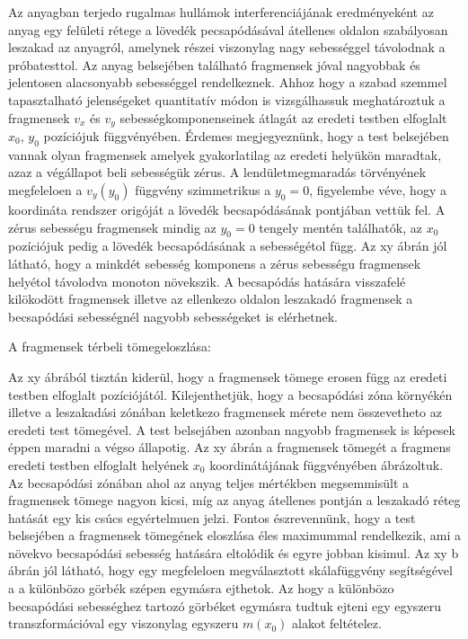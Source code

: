 Az anyagban terjedo rugalmas hullámok interferenciájának eredményeként az anyag egy felületi rétege a lövedék pecsapódásával átellenes oldalon
szabályosan leszakad az anyagról, amelynek részei viszonylag nagy sebességgel távolodnak a próbatesttol. Az anyag belsejében található fragmensek
jóval nagyobbak és jelentosen alacsonyabb sebességgel rendelkeznek. Ahhoz hogy a szabad szemmel tapasztalható jelenségeket quantitatív módon is 
vizsgálhassuk meghatároztuk a fragmensek $v_x$ és $v_y$ sebességkomponenseinek átlagát az eredeti testben elfoglalt $x_0$, $y_0$ pozíciójuk függvényében.
Érdemes megjegyeznünk, hogy a test belsejében vannak olyan fragmensek amelyek gyakorlatilag az eredeti helyükön maradtak, azaz a végállapot beli
sebességük zérus. A lendületmegmaradás törvényének megfeleloen a $v_y(y_0)$ függvény szimmetrikus a $y_0=0$, figyelembe véve, hogy a koordináta rendszer 
origóját a lövedék becsapódásának pontjában vettük fel. A zérus sebességu fragmensek mindig az $y_0=0$ tengely mentén találhatók, az
$x_0$ pozíciójuk pedig a lövedék becsapódásának a sebességétol függ. Az xy ábrán jól látható, hogy a minkdét sebesség komponens a zérus sebességu
fragmensek helyétol távolodva monoton növekszik. A becsapódás hatására visszafelé kilökodött fragmensek illetve az ellenkezo oldalon leszakadó
fragmensek a becsapódási sebességnél nagyobb sebességeket is elérhetnek.

A fragmensek térbeli tömegeloszlása:

Az xy ábrából tisztán kiderül, hogy a fragmensek tömege erosen függ az eredeti testben elfoglalt pozíciójától. Kilejenthetjük, hogy a becsapódási
zóna környékén illetve a leszakadási zónában keletkezo fragmensek mérete nem összevetheto az eredeti test tömegével. A test belsejáben azonban nagyobb fragmensek
is képesek éppen maradni a végso állapotig. Az xy ábrán a fragmensek tömegét a fragmens eredeti testben elfoglalt helyének $x_0$ koordinátájának függvényében ábrázoltuk.
Az becsapódási zónában ahol az anyag teljes mértékben megsemmisült a fragmensek tömege nagyon kicsi, míg az anyag átellenes pontján a leszakadó réteg hatását egy kis 
csúcs egyértelmuen jelzi. Fontos észrevennünk, hogy a test belsejében a fragmensek tömegének eloszlása éles maximummal rendelkezik, ami a növekvo becsapódási
sebesség hatására eltolódik és egyre jobban kisimul. Az xy b ábrán jól látható, hogy egy megfeleloen megválasztott skálafüggvény segítségével
a a különbözo görbék szépen egymásra ejthetok. Az hogy a különbözo becsapódási sebességhez tartozó görbéket egymásra tudtuk ejteni egy egyszeru transzformációval
egy viszonylag egyszeru $m(x_0)$ alakot feltételez.

